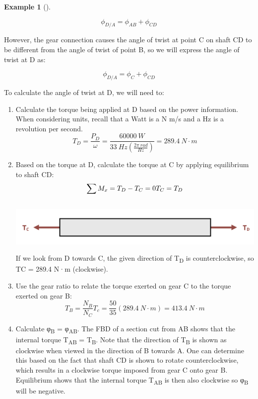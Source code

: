 \documentclass[
  letterpaper,
  DIV=11,
  numbers=noendperiod]{scrreprt}
\theoremstyle{definition}
\newtheorem{example}{Example}[chapter]
\theoremstyle{remark}
\begin{document}
\begin{tcolorbox}
\begin{example}[]
\begin{tcolorbox}
\[
\phi_{D / A}=\phi_{A B}+\phi_{C D}
\]

However, the gear connection causes the angle of twist at point C on
shaft CD to be different from the angle of twist of point B, so we will
express the angle of twist at D as:

\[
\phi_{D / A}=\phi_C+\phi_{C D}
\]

To calculate the angle of twist at D, we will need to:

\begin{enumerate}
\def\labelenumi{\arabic{enumi}.}
\item
  Calculate the torque being applied at D based on the power
  information. When considering units, recall that a Watt is a N m/s and
  a Hz is a revolution per second.\\
  \[
  T_D=\frac{P_D}{\omega}=\frac{60000{~W}}{33{~Hz}\left(\frac{2\pi{~rad}}{{Hz}}\right)}=289.4{~N}\cdot{m}
  \]
\item
  Based on the torque at D, calculate the torque at C by applying
  equilibrium to shaft CD:\\
  \[
  \sum M_x=T_D-T_C=0 \\ 
  T_C=T_D
  \]\\
  \includegraphics{images/CH6 PNGs/example 6.7 part 2.png}

  \hfill\break
  If we look from D towards C, the given direction of T\textsubscript{D}
  is counterclockwise, so TC = 289.4 N·m (clockwise).
\item
  Use the gear ratio to relate the torque exerted on gear C to the
  torque exerted on gear B:\\
  \[
  T_B=\frac{N_B}{N_C} T_c=\frac{50}{35}(289.4{~N}\cdot{m})=413.4{~N}\cdot{m}
  \]
\item
  Calculate φ\textsubscript{B} = φ\textsubscript{AB}. The FBD of a
  section cut from AB shows that the internal torque T\textsubscript{AB}
  = T\textsubscript{B}. Note that the direction of T\textsubscript{B} is
  shown as clockwise when viewed in the direction of B towards A. One
  can determine this based on the fact that shaft CD is shown to rotate
  counterclockwise, which results in a clockwise torque imposed from
  gear C onto gear B. Equilibrium shows that the internal torque
  T\textsubscript{AB} is then also clockwise so φ\textsubscript{B} will
  be negative.


\end{enumerate}
\end{tcolorbox}
\end{example}
\end{tcolorbox}
\end{document}
